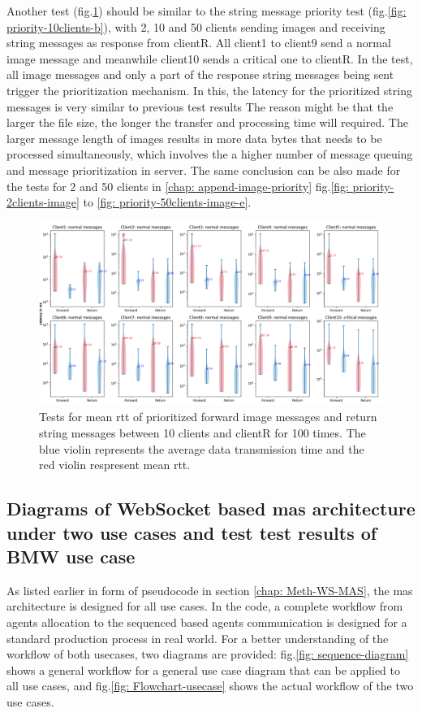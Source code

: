 Another test (fig.\ref{fig: priority-10clients-d}) should be similar to the string message priority test (fig.\ref{fig: priority-10clients-b}), 
with 2, 10 and 50 clients sending images and receiving string messages as response 
from clientR. 
All client1 to client9 send a normal image message and meanwhile 
client10 sends a critical one to clientR. 
In the test, all image messages and only a part of the response string messages 
being sent trigger the prioritization mechanism.  In this, the latency for 
the prioritized string messages is very similar to previous test results
The reason might be that the larger the file size, the longer the transfer 
and processing time will required. The larger message length of images 
results in more data bytes 
that needs to be processed simultaneously, which involves the a higher number of 
message queuing and message prioritization in server. The same conclusion can be 
also made for the tests for 2 and 50 clients in \ref{chap: append-image-priority} fig.\ref{fig: priority-2clients-image} 
to \ref{fig: priority-50clients-image-e}.


\begin{figure}
    \includegraphics[width=\textheight]{figures/tests/priority_tests/log_violin_10clients_image_priority.png}\hfill 
    \caption{Tests for mean \gls{rtt} of prioritized forward image messages and return string messages between 10 clients 
    and clientR for 100 times. The blue violin represents the average data transmission time and the red violin 
    respresent mean \gls{rtt}.} \label{fig: priority-10clients-d}
\end{figure}


\subsection{Diagrams of WebSocket based \gls{mas} architecture under two use cases and test 
test results of BMW use case}\label{chap: Result-Internal-Usecase}
As listed earlier in form of pseudocode in section \ref{chap: Meth-WS-MAS}, 
the \gls{mas} architecture is designed for all use cases. In the code, a complete 
workflow from agents allocation to the sequenced based agents communication 
is designed for a standard production process in real world. For a better 
understanding of the workflow of both usecases, two diagrams are provided: 
fig.\ref{fig: sequence-diagram} shows a general workflow for a general 
use case diagram that can be applied to all use cases, 
and fig.\ref{fig: Flowchart-usecase} shows the actual workflow of the 
two use cases. 



